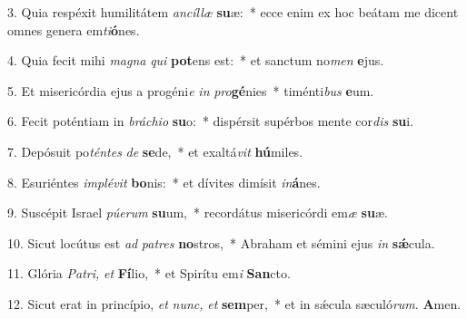 \item 3. Quia respéxit humilitátem \textit{ancíllæ} \textbf{su}æ:~* ecce enim ex hoc beátam me dicent omnes genera em\textit{ti}\textbf{ó}nes.

\item 4. Quia fecit mihi \textit{magna} \textit{qui} \textbf{pot}ens est:~* et sanctum no\textit{men} \textbf{e}jus.

\item 5. Et misericórdia ejus a progéni\textit{e} \textit{in} \textit{pro}\textbf{gé}nies~* timénti\textit{bus} \textbf{e}um.

\item 6. Fecit poténtiam in \textit{bráchio} \textbf{su}o:~* dispérsit supérbos mente cor\textit{dis} \textbf{su}i.

\item 7. Depósuit po\textit{téntes} \textit{de} \textbf{se}de,~* et exaltá\textit{vit} \textbf{hú}miles.

\item 8. Esuriéntes \textit{implévit} \textbf{bo}nis:~* et dívites dimísit \textit{in}\textbf{á}nes.

\item 9. Suscépit Israel \textit{púerum} \textbf{su}um,~* recordátus misericórdi em\textit{æ} \textbf{su}æ.

\item 10. Sicut locútus est \textit{ad} \textit{patres} \textbf{no}stros,~* Abraham et sémini ejus \textit{in} \textbf{sǽ}cula.

\item 11. Glória \textit{Patri,} \textit{et} \textbf{Fí}lio,~* et Spirítu em\textit{i} \textbf{San}cto.

\item 12. Sicut erat in princípio, \textit{et} \textit{nunc,} \textit{et} \textbf{sem}per,~* et in sǽcula sæculó\textit{rum}. \textbf{A}men.